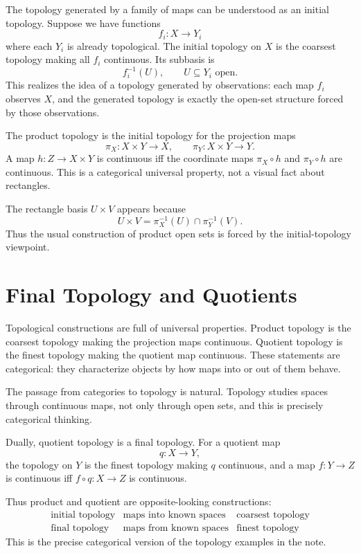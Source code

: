 The topology generated by a family of maps can be understood as an initial topology.  Suppose we have functions
\[
  f_i:X\to Y_i
\]
where each \(Y_i\) is already topological.  The initial topology on \(X\) is the coarsest topology making all \(f_i\) continuous.  Its subbasis is
\[
  f_i^{-1}(U),\qquad U\subseteq Y_i\text{ open}.
\]
This realizes the idea of a topology generated by observations: each map \(f_i\) observes \(X\), and the generated topology is exactly the open-set structure forced by those observations.

The product topology is the initial topology for the projection maps
\[
  \pi_X:X\times Y\to X,\qquad \pi_Y:X\times Y\to Y.
\]
A map \(h:Z\to X\times Y\) is continuous iff the coordinate maps \(\pi_X\circ h\) and \(\pi_Y\circ h\) are continuous.  This is a categorical universal property, not a visual fact about rectangles.

The rectangle basis \(U\times V\) appears because
\[
  U\times V=\pi_X^{-1}(U)\cap\pi_Y^{-1}(V).
\]
Thus the usual construction of product open sets is forced by the initial-topology viewpoint.

\section{Final Topology and Quotients}

Topological constructions are full of universal properties.  Product topology is the coarsest topology making the projection maps continuous.  Quotient topology is the finest topology making the quotient map continuous.  These statements are categorical: they characterize objects by how maps into or out of them behave.

The passage from categories to topology is natural.  Topology studies spaces through continuous maps, not only through open sets, and this is precisely categorical thinking.

Dually, quotient topology is a final topology.  For a quotient map
\[
  q:X\to Y,
\]
the topology on \(Y\) is the finest topology making \(q\) continuous, and a map \(f:Y\to Z\) is continuous iff \(f\circ q:X\to Z\) is continuous.

Thus product and quotient are opposite-looking constructions:
\[
\begin{array}{c|c|c}
\text{initial topology} & \text{maps into known spaces} & \text{coarsest topology}\\
\text{final topology} & \text{maps from known spaces} & \text{finest topology}
\end{array}
\]
This is the precise categorical version of the topology examples in the note.

